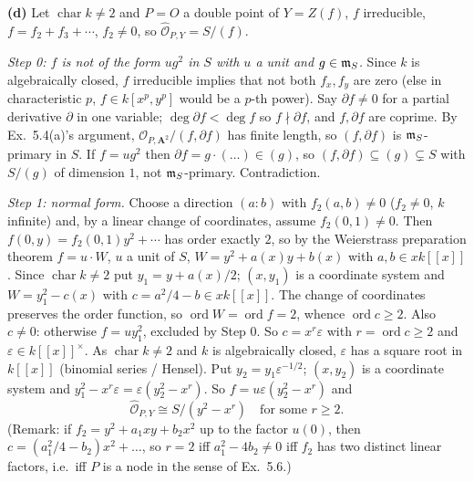 \documentclass[11pt]{article}
\begin{document}
\textbf{(d)} Let $\operatorname{char}k\ne2$ and $P=O$ a double point of $Y=Z(f)$, $f$ irreducible, $f=f_2+f_3+\cdots$, $f_2\ne0$, so $\hat{\mathcal O}_{P,Y}=S/(f)$.

\emph{Step 0: $f$ is not of the form $ug^2$ in $S$ with $u$ a unit and $g\in\mathfrak m_S$.} Since $k$ is algebraically closed, $f$ irreducible implies that not both $f_x,f_y$ are zero (else in characteristic $p$, $f\in k[x^p,y^p]$ would be a $p$-th power). Say $\partial f\neq0$ for a partial derivative $\partial$ in one variable; $\deg\partial f<\deg f$ so $f\nmid\partial f$, and $f,\partial f$ are coprime. By Ex.~5.4(a)'s argument, $\mathcal O_{P,\mathbf A^2}/(f,\partial f)$ has finite length, so $(f,\partial f)$ is $\mathfrak m_S$-primary in $S$. If $f=ug^2$ then $\partial f=g\cdot(\dots)\in(g)$, so $(f,\partial f)\subseteq(g)\subsetneq S$ with $S/(g)$ of dimension $1$, not $\mathfrak m_S$-primary. Contradiction.

\emph{Step 1: normal form.} Choose a direction $(a:b)$ with $f_2(a,b)\ne0$ ($f_2\ne0$, $k$ infinite) and, by a linear change of coordinates, assume $f_2(0,1)\neq0$. Then $f(0,y)=f_2(0,1)y^2+\cdots$ has order exactly $2$, so by the Weierstrass preparation theorem $f=u\cdot W$, $u$ a unit of $S$, $W=y^2+a(x)y+b(x)$ with $a,b\in xk[[x]]$. Since $\operatorname{char}k\ne2$ put $y_1=y+a(x)/2$; $(x,y_1)$ is a coordinate system and $W=y_1^2-c(x)$ with $c=a^2/4-b\in xk[[x]]$. The change of coordinates preserves the order function, so $\operatorname{ord}W=\operatorname{ord}f=2$, whence $\operatorname{ord}c\ge2$. Also $c\ne0$: otherwise $f=uy_1^2$, excluded by Step 0. So $c=x^r\varepsilon$ with $r=\operatorname{ord}c\ge2$ and $\varepsilon\in k[[x]]^\times$. As $\operatorname{char}k\ne2$ and $k$ is algebraically closed, $\varepsilon$ has a square root in $k[[x]]$ (binomial series / Hensel). Put $y_2=y_1\varepsilon^{-1/2}$; $(x,y_2)$ is a coordinate system and $y_1^2-x^r\varepsilon=\varepsilon(y_2^2-x^r)$. So $f=u\varepsilon(y_2^2-x^r)$ and
\[
\hat{\mathcal O}_{P,Y}\cong S/(y^2-x^r)\quad\text{for some }r\ge2.
\]
(Remark: if $f_2=y^2+a_1xy+b_2x^2$ up to the factor $u(0)$, then $c=(a_1^2/4-b_2)x^2+\dots$, so $r=2$ iff $a_1^2-4b_2\ne0$ iff $f_2$ has two distinct linear factors, i.e.\ iff $P$ is a node in the sense of Ex.~5.6.)
\end{document}
